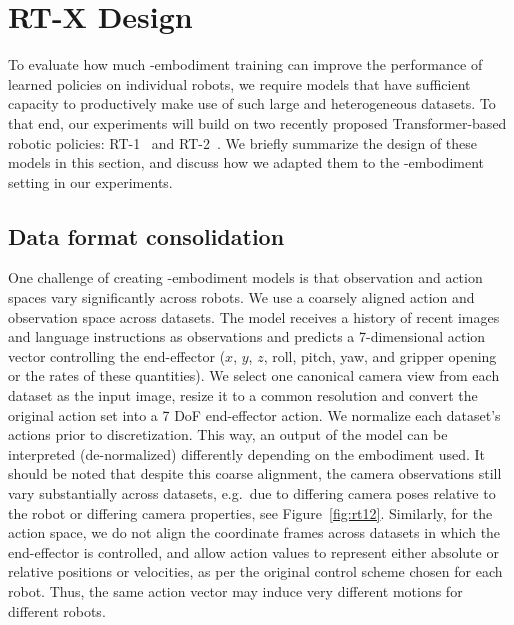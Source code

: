 \section{RT-X Design}
\vspace{-0.16em}

To evaluate how much \cro-embodiment training can improve the performance of learned policies on individual robots, we require models that have sufficient capacity to productively make use of such large and heterogeneous datasets. To that end, our experiments will build on two recently proposed Transformer-based robotic policies: RT-1~\cite{brohan2023rt1} and RT-2~\cite{brohan2023rt2}. We briefly summarize the design of these models in this section, and discuss how we adapted them to the \cro-embodiment setting in our experiments.

\vspace{-0.3em}
\subsection{Data format consolidation}
\vspace{-0.15em}
One challenge of creating \cro-embodiment models is that observation and action spaces vary significantly across robots.
We use a coarsely aligned action and observation space across datasets.
The model receives a history of recent images and language instructions as observations
and predicts a 7-dimensional action vector controlling the end-effector ($x$, $y$, $z$, roll, pitch, yaw, and gripper opening or the rates of these quantities). We select one canonical camera view from each dataset as the input image, resize it to a common resolution and convert the original action set into a 7 DoF end-effector action. 
We normalize each dataset's actions prior to discretization.
This way, an output of the model can be interpreted (de-normalized) differently depending on the embodiment used.
It should be noted that despite this coarse alignment, the camera observations still vary substantially across datasets, e.g.\ due to differing camera poses relative to the robot or differing camera properties, see Figure~\ref{fig:rt12}.
Similarly, for the action space, we do not align the coordinate frames across datasets in which the end-effector is controlled, and allow action values to represent either absolute or relative positions or velocities, as per the original control scheme chosen for each robot. 
Thus, the same action vector may induce very different motions for different robots.

